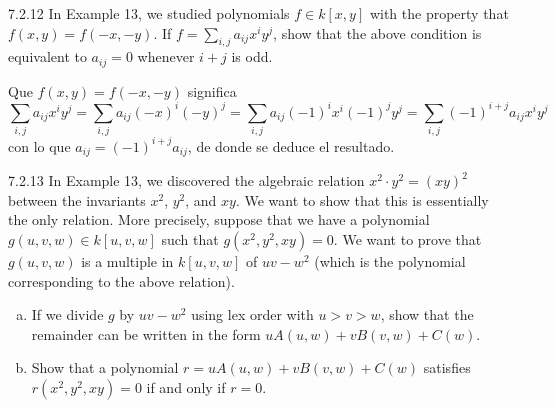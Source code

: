 \documentclass[twoside]{article}
\begin{document}
\begin{ejercicio}{7.2.12}
In Example 13, we studied polynomials $f ∈ k[x, y]$ with the property that $f (x, y) =
f (−x,−y)$. If $f =\sum_{i,j} a_{ij}x^iy^j$, show that the above condition is equivalent to $a_{ij} = 0$
whenever $i + j$ is odd.
\end{ejercicio}
\begin{solucion}
Que $f(x,y)=f(-x,-y)$ significa
\[
\sum_{i,j} a_{ij}x^iy^j=\sum_{i,j} a_{ij}(-x)^i(-y)^j=\sum_{i,j} a_{ij}(-1)^ix^i(-1)^jy^j=\sum_{i,j} (-1)^{i+j}a_{ij}x^iy^j
\]
con lo que $a_{ij}=(-1)^{i+j}a_{ij}$, de donde se deduce el resultado. 
\end{solucion}
\newpage
\begin{ejercicio}{7.2.13}
In Example 13, we discovered the algebraic relation $x^2\cdot y^2 = (xy)^2$ between the invariants
$x^2$, $y^2$, and $xy$. We want to show that this is essentially the only relation. More precisely,
suppose that we have a polynomial $g(u, v, w) ∈ k[u, v, w]$ such that $g(x^2, y^2, xy) = 0$.
We want to prove that $g(u, v, w)$ is a multiple in $k[u, v, w]$ of $uv − w^2$ (which is the
polynomial corresponding to the above relation).
\begin{enumerate}[a.]
\item If we divide $g$ by $uv − w^2$ using lex order with $u > v > w$, show that the remainder
can be written in the form $uA(u, w) + vB(v, w) + C(w)$.
\item Show that a polynomial $r = uA(u, w) + vB(v, w) + C(w)$ satisfies $r(x^2, y^2, xy) = 0$
if and only if $r = 0$.
\end{enumerate}
\end{ejercicio}
\end{document}
